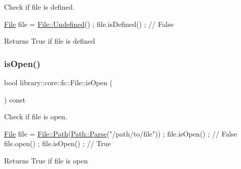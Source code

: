 Check if file is defined. 


\begin{DoxyCode}
\hyperlink{classlibrary_1_1core_1_1fs_1_1_file_a6f3f0d79545ac9984c6f49432f0c6c39}{File} file = \hyperlink{classlibrary_1_1core_1_1fs_1_1_file_af45fa5c36c359a979149845ef06586e6}{File::Undefined}() ;
file.isDefined() ; \textcolor{comment}{// False}
\end{DoxyCode}


\begin{DoxyReturn}{Returns}
True if file is defined 
\end{DoxyReturn}
\mbox{\label{classlibrary_1_1core_1_1fs_1_1_file_a838cd36a7f54aaff75859b69cc9dac40}} 
\subsubsection{\texorpdfstring{is\+Open()}{isOpen()}}
{\footnotesize\ttfamily bool library\+::core\+::fs\+::\+File\+::is\+Open (\begin{DoxyParamCaption}{ }\end{DoxyParamCaption}) const}



Check if file is open. 


\begin{DoxyCode}
\hyperlink{classlibrary_1_1core_1_1fs_1_1_file_a6f3f0d79545ac9984c6f49432f0c6c39}{File} file = \hyperlink{classlibrary_1_1core_1_1fs_1_1_file_a72d6cdf8bb7e299889c6149e2b8a6cc7}{File::Path}(\hyperlink{classlibrary_1_1core_1_1fs_1_1_path_a6ba644b6609507e724c217bf2020f5ae}{Path::Parse}(\textcolor{stringliteral}{"/path/to/file"})) ;
file.isOpen() ; \textcolor{comment}{// False}
file.open() ;
file.isOpen() ; \textcolor{comment}{// True}
\end{DoxyCode}


\begin{DoxyReturn}{Returns}
True if file is open 
\end{DoxyReturn}
\mbox{\label{classlibrary_1_1core_1_1fs_1_1_file_ac81efdfeb17ea50abe23d96f69bc15ae}} 

